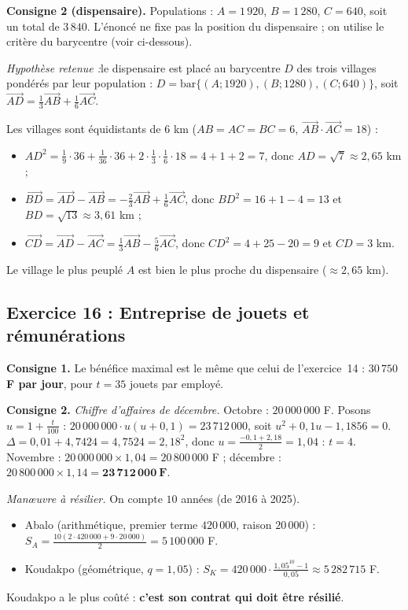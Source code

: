 \documentclass[11pt,a4paper]{article}
\newcommand{\vect}[1]{\overrightarrow{#1}}
\newenvironment{hyp}{\par\medskip\noindent\textit{Hypoth\`ese retenue :}\quad}{\par\medskip}
\begin{document}
\medskip\noindent\textbf{Consigne 2 (dispensaire).} Populations : $A=1\,920$, $B=1\,280$, $C=640$, soit un total de $3\,840$.
L'\'enonc\'e ne fixe pas la position du dispensaire ; on utilise le crit\`ere du barycentre (voir ci-dessous).
\begin{hyp}le dispensaire est plac\'e au barycentre $D$ des trois villages pond\'er\'es par leur population :
$D=\mathrm{bar}\{(A;1920),(B;1280),(C;640)\}$, soit $\vect{AD}=\tfrac13\vect{AB}+\tfrac16\vect{AC}$.\end{hyp}
Les villages sont \'equidistants de $6$ km ($AB=AC=BC=6$, $\vect{AB}\cdot\vect{AC}=18$) :
\begin{itemize}
  \item $AD^2=\tfrac19\cdot36+\tfrac1{36}\cdot36+2\cdot\tfrac13\cdot\tfrac16\cdot18=4+1+2=7$, donc $AD=\sqrt7\approx2{,}65$ km ;
  \item $\vect{BD}=\vect{AD}-\vect{AB}=-\tfrac23\vect{AB}+\tfrac16\vect{AC}$, donc $BD^2=16+1-4=13$ et $BD=\sqrt{13}\approx3{,}61$ km ;
  \item $\vect{CD}=\vect{AD}-\vect{AC}=\tfrac13\vect{AB}-\tfrac56\vect{AC}$, donc $CD^2=4+25-20=9$ et $CD=3$ km.
\end{itemize}
Le village le plus peupl\'e $A$ est bien le plus proche du dispensaire ($\approx2{,}65$ km).

\subsection{Exercice 16 : Entreprise de jouets et r\'emun\'erations}

\textbf{Consigne 1.} Le b\'en\'efice maximal est le m\^eme que celui de l'exercice~14 : \textbf{$30\,750$ F par jour}, pour $t=35$ jouets par employ\'e.

\medskip\noindent\textbf{Consigne 2.}
\emph{Chiffre d'affaires de d\'ecembre.} Octobre : $20\,000\,000$ F. Posons $u=1+\frac{t}{100}$ :
$20\,000\,000\cdot u(u+0{,}1)=23\,712\,000$, soit $u^2+0{,}1u-1{,}1856=0$.
$\Delta=0{,}01+4{,}7424=4{,}7524=2{,}18^2$, donc $u=\frac{-0{,}1+2{,}18}{2}=1{,}04$ : $t=4$.
Novembre : $20\,000\,000\times1{,}04=20\,800\,000$ F ; d\'ecembre : $20\,800\,000\times1{,}14=\mathbf{23\,712\,000\ F}$.

\emph{Manœuvre \`a r\'esilier.} On compte $10$ ann\'ees (de 2016 \`a 2025).
\begin{itemize}
  \item Abalo (arithm\'etique, premier terme $420\,000$, raison $20\,000$) :
  $\displaystyle S_A=\frac{10(2\cdot420\,000+9\cdot20\,000)}{2}=5\,100\,000$ F.
  \item Koudakpo (g\'eom\'etrique, $q=1{,}05$) :
  $\displaystyle S_K=420\,000\cdot\frac{1{,}05^{10}-1}{0{,}05}\approx5\,282\,715$ F.
\end{itemize}
Koudakpo a le plus co\^ut\'e : \textbf{c'est son contrat qui doit \^etre r\'esili\'e}.
\end{document}
